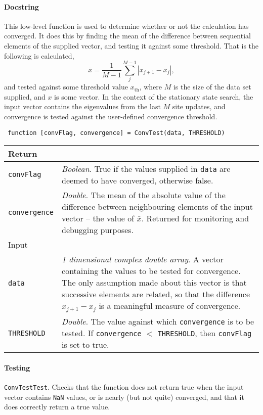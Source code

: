  \paragraph{Docstring} This low-level function is used to determine whether or not the calculation has converged. It does this by finding the mean of the difference between sequential elements of the supplied vector, and testing it against some threshold. That is the following is calculated,
 \begin{equation}
 	\bar{x} = \frac{1}{M-1} \sum_{j}^{M-1} | x_{j+1} - x_{j} |,
 \end{equation}
 and tested against some threshold value \(x_{\mathrm{th}}\), where \(M\) is the size of the data set supplied, and \(x\) is some vector. In the context of the stationary state search, the input vector contains the eigenvalues from the last \(M\) site updates, and convergence is tested against the user-defined convergence threshold.
 \begin{lstlisting}
 function [convFlag, convergence] = ConvTest(data, THRESHOLD) \end{lstlisting}
 \begin{longtabu}{X[1,1]X[4,1]}
 \hline
 Return & \\ \hline
 \lstinline$convFlag$ & \emph{Boolean}. True if the values supplied in \lstinline$data$ are deemed to have converged, otherwise false. \\
 \lstinline$convergence$ & \emph{Double}. The mean of the absolute value of the difference between neighbouring elements of the input vector -- the value of \(\bar{x}\). Returned for monitoring and debugging purposes. \\ \hline
 Input & \\ \hline
 \lstinline$data$ & \emph{1 dimensional complex double array}. A vector containing the values to be tested for convergence. The only assumption made about this vector is that successive elements are related, so that the difference \(x_{j+1} - x_{j}\) is a meaningful measure of convergence. \\
 \lstinline$THRESHOLD$ & \emph{Double}. The value against which \lstinline$convergence$ is to be tested. If \lstinline$convergence$ \(<\) \lstinline$THRESHOLD$, then \lstinline$convFlag$ is set to true. \\
 \hline
 \end{longtabu}
 \paragraph{Testing} \lstinline$ConvTestTest$. Checks that the function does not return true when the input vector contains \lstinline$NaN$ values, or is nearly (but not quite) converged, and that it does correctly return a true value.

